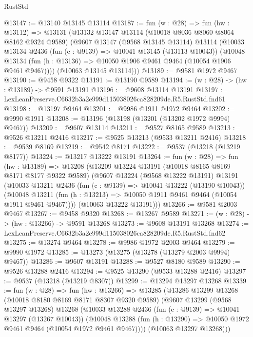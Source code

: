 \begin{lexlean}{RustStd}
\begin{coremodule}
@13147 := @13140 @13145 @13114
@13187 := fun (w : @28) =>
  fun (hw : @13112) =>
  @13131
    (@13132
      @13147
      @13114
      (@10018 @8036 @8060 @8064 @8162 @9324 @9589)
      (@9607
        @13147
        (@9568 @13145 @13114)
        @13114
        (@10033
          @13134
          @2436
          (fun (c : @9139) => @10041 @13145 (@13113 @10043))
          (@10048 @13134 (fun (h : @13136) => @10050 @1906 @9461 @9464 (@10054 @1906 @9461 @9467))))
        (@10063 @13145 @13114)))
@13189 := @9581 @1972 @9467
@13190 := @9458 @9322
@13191 := @13190 @9589
@13194 := (w : @28) -> (hw : @13189) -> @9591 @13191
@13196 := @9608 @13114 @13191
@13197 := LexLeanPreserve.C6632b3a2e999d115038026ca828209de.R5.RustStd.fnd61
@13198 := @13197 @9464
@13201 := @9986 @1911 @1972 @9464
@13202 := @9990 @1911
@13208 := @13196 (@13198 (@13201 (@13202 @1972 @9994) @9467))
@13209 := @9607 @13114
@13211 := @9527 @8165 @9589
@13213 := @9526 @13211 @2416
@13217 := @9525 @13213 (@9533 @13211 @2416)
@13218 := @9539 @8169
@13219 := @9542 @8171
@13222 := @9537 (@13218 (@13219 @8177))
@13224 := @13217 @13222 @13191
@13264 := fun (w : @28) =>
  fun (hw : @13189) =>
  @13208
    (@13209
      @13224
      @13191
      (@10018 @8165 @8169 @8171 @8177 @9322 @9589)
      (@9607
        @13224
        (@9568 @13222 @13191)
        @13191
        (@10033
          @13211
          @2436
          (fun (c : @9139) => @10041 @13222 (@13190 @10043))
          (@10048 @13211 (fun (h : @13213) => @10050 @1911 @9461 @9464 (@10054 @1911 @9461 @9467))))
        (@10063 @13222 @13191)))
@13266 := @9581 @2003 @9467
@13267 := @9458 @9320
@13268 := @13267 @9589
@13271 := (w : @28) -> (hw : @13266) -> @9591 @13268
@13273 := @9608 @13191 @13268
@13274 := LexLeanPreserve.C6632b3a2e999d115038026ca828209de.R5.RustStd.fnd62
@13275 := @13274 @9464
@13278 := @9986 @1972 @2003 @9464
@13279 := @9990 @1972
@13285 := @13273 (@13275 (@13278 (@13279 @2003 @9994) @9467))
@13286 := @9607 @13191
@13288 := @9527 @8180 @9589
@13290 := @9526 @13288 @2416
@13294 := @9525 @13290 (@9533 @13288 @2416)
@13297 := @9537 (@13218 (@13219 @8307))
@13299 := @13294 @13297 @13268
@13339 := fun (w : @28) =>
  fun (hw : @13266) =>
  @13285
    (@13286
      @13299
      @13268
      (@10018 @8180 @8169 @8171 @8307 @9320 @9589)
      (@9607
        @13299
        (@9568 @13297 @13268)
        @13268
        (@10033
          @13288
          @2436
          (fun (c : @9139) => @10041 @13297 (@13267 @10043))
          (@10048 @13288 (fun (h : @13290) => @10050 @1972 @9461 @9464 (@10054 @1972 @9461 @9467))))
        (@10063 @13297 @13268)))

\end{coremodule}
\end{lexlean}
